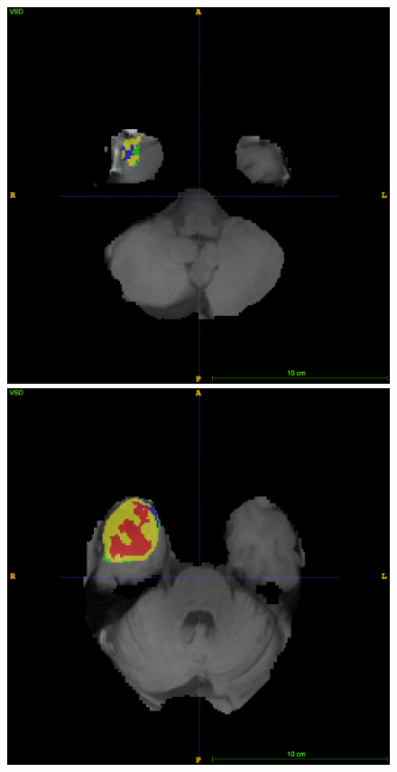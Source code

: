 \documentclass[12pt,a4paper,twoside,openright]{report}
\begin{document}
\begin{figure}
	\centering
	\includegraphics[scale=0.1]{expert_segmentation_49}
	\includegraphics[scale=0.1]{expert_segmentation_59}

\end{figure}
\end{document}
